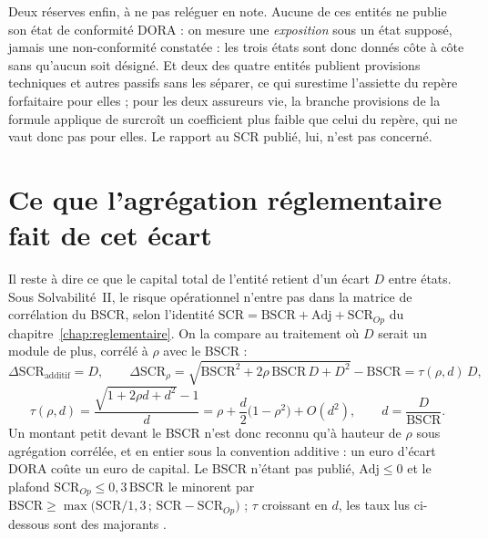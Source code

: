 Deux réserves enfin, à ne pas reléguer en note. Aucune de ces entités ne publie son état de
conformité DORA : on mesure une \emph{exposition} sous un état supposé, jamais une
non-conformité constatée : les trois états sont donc donnés côte à côte sans qu'aucun
soit désigné. Et deux des quatre entités publient \og provisions techniques et autres passifs\fg{}
sans les séparer, ce qui surestime l'assiette du repère forfaitaire pour elles ; pour les deux
assureurs vie, la branche provisions de la formule applique de surcroît un coefficient plus faible
que celui du repère, qui ne vaut donc pas pour elles. Le rapport au SCR publié, lui,
n'est pas concerné.


\section{Ce que l'agrégation réglementaire fait de cet écart}
\label{sec:agregation-scr}

Il reste à dire ce que le capital total de l'entité retient d'un écart $D$ entre états. Sous
Solvabilité~II, le risque opérationnel n'entre pas dans la matrice de corrélation du BSCR, selon
l'identité $\mathrm{SCR} = \mathrm{BSCR} + \mathrm{Adj} + \mathrm{SCR}_{Op}$ du
chapitre~\ref{chap:reglementaire}. On la compare au traitement où $D$ serait un module de plus,
corrélé à $\rho$ avec le BSCR :
\begin{equation}\label{eq:agregation}
\Delta\mathrm{SCR}_{\text{additif}} = D,\qquad
\Delta\mathrm{SCR}_{\rho}=\sqrt{\mathrm{BSCR}^2+2\rho\,\mathrm{BSCR}\,D+D^2}-\mathrm{BSCR}
=\tau(\rho,d)\,D,
\end{equation}
\begin{equation}\label{eq:tau}
\tau(\rho,d)=\frac{\sqrt{1+2\rho d+d^2}-1}{d}
=\rho+\frac{d}{2}\bigl(1-\rho^2\bigr)+O(d^2),\qquad d=\frac{D}{\mathrm{BSCR}} .
\end{equation}
Un montant petit devant le BSCR n'est donc reconnu qu'à hauteur de $\rho$ sous agrégation
corrélée, et en entier sous la convention additive : un euro d'écart DORA coûte un euro de
capital. Le BSCR n'étant pas publié, $\mathrm{Adj}\le 0$ et le plafond
$\mathrm{SCR}_{Op}\le 0{,}3\,\mathrm{BSCR}$ le minorent par
$\mathrm{BSCR}\ge\max\bigl(\mathrm{SCR}/1{,}3\,;\,\mathrm{SCR}-\mathrm{SCR}_{Op}\bigr)$ ;
$\tau$ croissant en $d$, les taux lus ci-dessous sont des majorants \matcomp.


